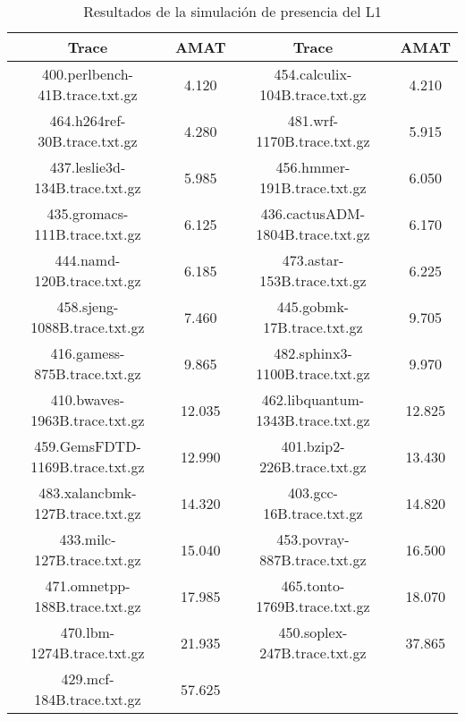 \begin{table}[H]
\centering
\begin{tabular}{|c|c|c|c|}
\hline
Trace  & AMAT  & Trace  & AMAT  \\
\hline
400.perlbench-41B.trace.txt.gz & 4.120 & 454.calculix-104B.trace.txt.gz & 4.210 \\\hline
464.h264ref-30B.trace.txt.gz & 4.280 & 481.wrf-1170B.trace.txt.gz & 5.915 \\\hline
437.leslie3d-134B.trace.txt.gz & 5.985 & 456.hmmer-191B.trace.txt.gz & 6.050 \\\hline
435.gromacs-111B.trace.txt.gz & 6.125 & 436.cactusADM-1804B.trace.txt.gz & 6.170 \\\hline
444.namd-120B.trace.txt.gz & 6.185 & 473.astar-153B.trace.txt.gz & 6.225 \\\hline
458.sjeng-1088B.trace.txt.gz & 7.460 & 445.gobmk-17B.trace.txt.gz & 9.705 \\\hline
416.gamess-875B.trace.txt.gz & 9.865 & 482.sphinx3-1100B.trace.txt.gz & 9.970 \\\hline
410.bwaves-1963B.trace.txt.gz & 12.035 & 462.libquantum-1343B.trace.txt.gz & 12.825 \\\hline
459.GemsFDTD-1169B.trace.txt.gz & 12.990 & 401.bzip2-226B.trace.txt.gz & 13.430 \\\hline
483.xalancbmk-127B.trace.txt.gz & 14.320 & 403.gcc-16B.trace.txt.gz & 14.820 \\\hline
433.milc-127B.trace.txt.gz & 15.040 & 453.povray-887B.trace.txt.gz & 16.500 \\\hline
471.omnetpp-188B.trace.txt.gz & 17.985 & 465.tonto-1769B.trace.txt.gz & 18.070 \\\hline
470.lbm-1274B.trace.txt.gz & 21.935 & 450.soplex-247B.trace.txt.gz & 37.865 \\\hline
429.mcf-184B.trace.txt.gz & 57.625 &  &  \\\hline
\end{tabular}
\caption{Resultados de la simulación de presencia del L1}
\label{tab:amatL1}
\end{table}